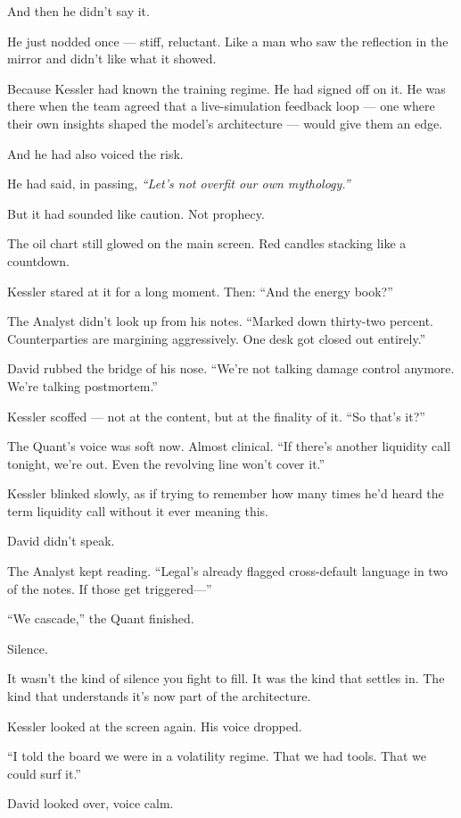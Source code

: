 And then he didn’t say it.

He just nodded once — stiff, reluctant. Like a man who saw the reflection in the mirror and didn’t like what it showed.

Because Kessler had known the training regime. He had signed off on it. He was there when the team agreed that a live-simulation feedback loop — one where their own insights shaped the model’s architecture — would give them an edge.

And he had also voiced the risk.

He had said, in passing, \textit{“Let’s not overfit our own mythology.”}

But it had sounded like caution. Not prophecy.

The oil chart still glowed on the main screen. Red candles stacking like a countdown.

Kessler stared at it for a long moment.
Then: “And the energy book?”

The Analyst didn’t look up from his notes. “Marked down thirty-two percent. Counterparties are margining aggressively. One desk got closed out entirely.”

David rubbed the bridge of his nose. “We’re not talking damage control anymore. We’re talking postmortem.”

Kessler scoffed — not at the content, but at the finality of it. “So that’s it?”

The Quant’s voice was soft now. Almost clinical. “If there’s another liquidity call tonight, we’re out. Even the revolving line won’t cover it.”

Kessler blinked slowly, as if trying to remember how many times he’d heard the term liquidity call without it ever meaning this.

David didn’t speak.

The Analyst kept reading. “Legal’s already flagged cross-default language in two of the notes. If those get triggered—”

“We cascade,” the Quant finished.

Silence.

It wasn’t the kind of silence you fight to fill.
It was the kind that settles in.
The kind that understands it’s now part of the architecture.

Kessler looked at the screen again. His voice dropped.

“I told the board we were in a volatility regime. That we had tools. That we could surf it.”

David looked over, voice calm.

